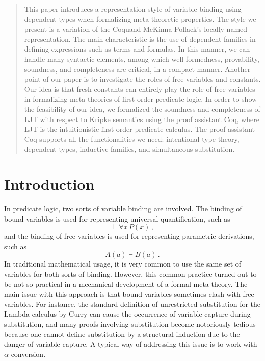\documentclass{kms-j}
\theoremstyle{plain}
\theoremstyle{remark}
\begin{document}






\begin{abstract}
%
This paper introduces a representation style of variable binding using dependent types
when formalizing meta-theoretic properties.
The style we present is a variation of the Coquand-McKinna-Pollack's locally-named representation.
The main characteristic is the use of dependent families in defining
expressions such as terms and formulas.
In this manner, we can handle many syntactic elements,
among which well-formedness, provability, soundness, and completeness are critical, in a compact manner.
Another point of our paper is to investigate the roles of free variables and constants.
Our idea is that fresh constants can entirely play the role of free variables
in formalizing meta-theories of first-order predicate logic.
In order to show the feasibility of our idea, we formalized the
soundness and completeness of LJT with respect to Kripke semantics
using the proof assistant Coq, where LJT is the intuitionistic first-order predicate calculus.
The proof assistant Coq supports all the functionalities we need:
intentional type theory, dependent types,
inductive families, and simultaneous substitution.
\end{abstract}

\maketitle


\section{Introduction}

In predicate logic, two sorts of variable binding are involved. The
binding of bound variables is used for representing universal
quantification, such as
\[
\vdash \forall x\, P(x)\, ,
\]
and the binding of free variables is used for representing parametric
derivations, such as
\[
A(a) \vdash B(a)\, .
\]
In traditional mathematical usage,
it is very common to use the same set of variables for both sorts of binding.
However, this common practice turned out to be not so practical in a mechanical development of
a formal meta-theory.
The main issue with this approach is that bound variables sometimes clash with free variables.
For instance, the standard definition of unrestricted substitution for the Lambda calculus
by Curry \citep[p.~ 94]{Curry1958} can cause the occurrence of variable capture during
substitution, and many proofs involving substitution become notoriously tedious because
one cannot define substitution by a structural induction due to the danger of variable capture.
A typical way of addressing this issue is to work with $\alpha$-conversion.
\end{document}
